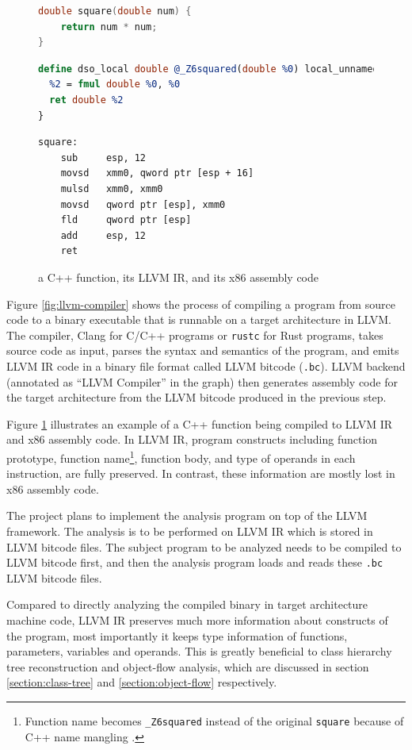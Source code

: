 \begin{figure}[H]
    \centering
    \begin{lstlisting}[language=c]
double square(double num) {
    return num * num;
}
    \end{lstlisting}
    \begin{lstlisting}[language=llvm]
define dso_local double @_Z6squared(double %0) local_unnamed_addr #0 {
  %2 = fmul double %0, %0
  ret double %2
}
    \end{lstlisting}
    \begin{lstlisting}[language={[x86masm]Assembler}]
square:
    sub     esp, 12
    movsd   xmm0, qword ptr [esp + 16]
    mulsd   xmm0, xmm0
    movsd   qword ptr [esp], xmm0
    fld     qword ptr [esp]
    add     esp, 12
    ret
    \end{lstlisting}
    \caption{a C++ function, its LLVM IR, and its x86 assembly code}
    \label{fig:llvm-ir}
\end{figure}

Figure \ref{fig:llvm-compiler} shows the process of compiling a program from source code to a binary executable that is runnable on a target architecture in LLVM. The compiler, Clang for C/C++ programs or \texttt{rustc} for Rust programs, takes source code as input, parses the syntax and semantics of the program, and emits LLVM IR code in a binary file format called LLVM bitcode (\texttt{.bc}). LLVM backend (annotated as ``LLVM Compiler'' in the graph) then generates assembly code for the target architecture from the LLVM bitcode produced in the previous step.

Figure \ref{fig:llvm-ir} illustrates an example of a C++ function being compiled to LLVM IR and x86 assembly code. In LLVM IR, program constructs including function prototype, function name\footnote{Function name becomes \texttt{\_Z6squared} instead of the original \texttt{square} because of C++ name mangling \cite{name-mangling}.}, function body, and type of operands in each instruction, are fully preserved. In contrast, these information are mostly lost in x86 assembly code.

The project plans to implement the analysis program on top of the LLVM framework. The analysis is to be performed on LLVM IR which is stored in LLVM bitcode files. The subject program to be analyzed needs to be compiled to LLVM bitcode first, and then the analysis program loads and reads these \texttt{.bc} LLVM bitcode files.

Compared to directly analyzing the compiled binary in target architecture machine code, LLVM IR preserves much more information about constructs of the program, most importantly it keeps type information of functions, parameters, variables and operands. This is greatly beneficial to class hierarchy tree reconstruction and object-flow analysis, which are discussed in section \ref{section:class-tree} and \ref{section:object-flow} respectively.

